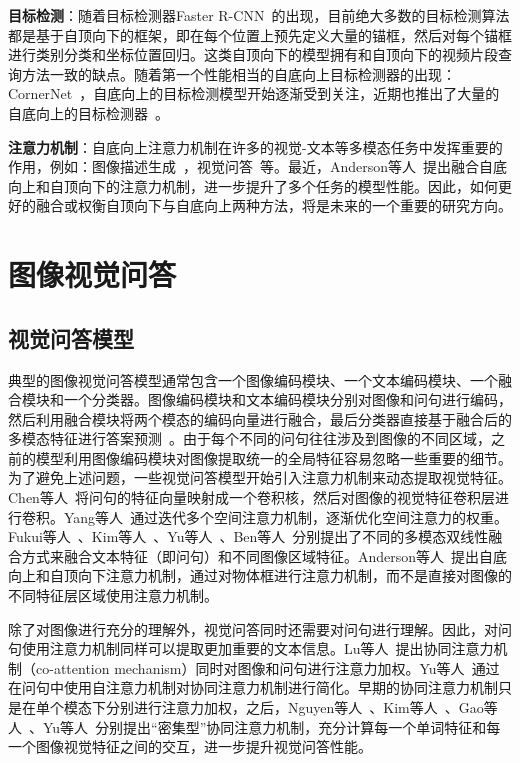 \textbf{目标检测}：随着目标检测器Faster R-CNN~\cite{ren2015faster}的出现，目前绝大多数的目标检测算法都是基于自顶向下的框架，即在每个位置上预先定义大量的锚框，然后对每个锚框进行类别分类和坐标位置回归。这类自顶向下的模型拥有和自顶向下的视频片段查询方法一致的缺点。随着第一个性能相当的自底向上目标检测器的出现：CornerNet~\cite{law2018cornernet}，自底向上的目标检测模型开始逐渐受到关注，近期也推出了大量的自底向上的目标检测器~\cite{zhou2019bottom,zhou2019objects,duan2019centernet,tian2019fcos}。

\textbf{注意力机制}：自底向上注意力机制在许多的视觉-文本等多模态任务中发挥重要的作用，例如：图像描述生成~\cite{xu2015show,chen2017sca}，视觉问答~\cite{xu2016ask,ye2017video}等。最近，Anderson等人~\cite{anderson2018bottom}提出融合自底向上和自顶向下的注意力机制，进一步提升了多个任务的模型性能。因此，如何更好的融合或权衡自顶向下与自底向上两种方法，将是未来的一个重要的研究方向。


\section{图像视觉问答}

\subsection{视觉问答模型}

典型的图像视觉问答模型通常包含一个图像编码模块、一个文本编码模块、一个融合模块和一个分类器。图像编码模块和文本编码模块分别对图像和问句进行编码，然后利用融合模块将两个模态的编码向量进行融合，最后分类器直接基于融合后的多模态特征进行答案预测~\cite{zhou2015simple,antol2015vqa,kim2016multimodal}。由于每个不同的问句往往涉及到图像的不同区域，之前的模型利用图像编码模块对图像提取统一的全局特征容易忽略一些重要的细节。为了避免上述问题，一些视觉问答模型开始引入注意力机制来动态提取视觉特征。Chen等人~\cite{chen2016abc}将问句的特征向量映射成一个卷积核，然后对图像的视觉特征卷积层进行卷积。Yang等人~\cite{yang2016stacked}通过迭代多个空间注意力机制，逐渐优化空间注意力的权重。Fukui等人~\cite{fukui2016multimodal}、Kim等人~\cite{kim2017hadamard,kim2018bilinear}、Yu等人~\cite{yu2017multi,yu2018beyond}、Ben等人~\cite{ben2017mutan,ben2019block}分别提出了不同的多模态双线性融合方式来融合文本特征（即问句）和不同图像区域特征。Anderson等人~\cite{anderson2018bottom}提出自底向上和自顶向下注意力机制，通过对物体框进行注意力机制，而不是直接对图像的不同特征层区域使用注意力机制。

除了对图像进行充分的理解外，视觉问答同时还需要对问句进行理解。因此，对问句使用注意力机制同样可以提取更加重要的文本信息。Lu等人~\cite{lu2017hierarchical}提出协同注意力机制（co-attention mechanism）同时对图像和问句进行注意力加权。Yu等人~\cite{yu2018beyond}通过在问句中使用自注意力机制对协同注意力机制进行简化。早期的协同注意力机制只是在单个模态下分别进行注意力加权，之后，Nguyen等人~\cite{nguyen2018improved}、Kim等人~\cite{kim2018bilinear}、Gao等人~\cite{gao2019dynamic}、Yu等人~\cite{yu2019deep}分别提出“密集型”协同注意力机制，充分计算每一个单词特征和每一个图像视觉特征之间的交互，进一步提升视觉问答性能。


